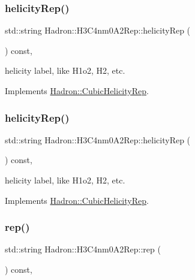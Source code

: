 \subsubsection{\texorpdfstring{helicityRep()}{helicityRep()}\hspace{0.1cm}{\footnotesize\ttfamily [2/3]}}
{\footnotesize\ttfamily std\+::string Hadron\+::\+H3\+C4nm0\+A2\+Rep\+::helicity\+Rep (\begin{DoxyParamCaption}{ }\end{DoxyParamCaption}) const\hspace{0.3cm}{\ttfamily [inline]}, {\ttfamily [virtual]}}

helicity label, like H1o2, H2, etc. 

Implements \mbox{\hyperlink{structHadron_1_1CubicHelicityRep_af1096946b7470edf0a55451cc662f231}{Hadron\+::\+Cubic\+Helicity\+Rep}}.

\mbox{\label{structHadron_1_1H3C4nm0A2Rep_a14eb635569428c91f83b7019b68ab2b6}} 
\subsubsection{\texorpdfstring{helicityRep()}{helicityRep()}\hspace{0.1cm}{\footnotesize\ttfamily [3/3]}}
{\footnotesize\ttfamily std\+::string Hadron\+::\+H3\+C4nm0\+A2\+Rep\+::helicity\+Rep (\begin{DoxyParamCaption}{ }\end{DoxyParamCaption}) const\hspace{0.3cm}{\ttfamily [inline]}, {\ttfamily [virtual]}}

helicity label, like H1o2, H2, etc. 

Implements \mbox{\hyperlink{structHadron_1_1CubicHelicityRep_af1096946b7470edf0a55451cc662f231}{Hadron\+::\+Cubic\+Helicity\+Rep}}.

\mbox{\label{structHadron_1_1H3C4nm0A2Rep_ab4e5ed700d7f03a7c2b8368304277671}} 
\subsubsection{\texorpdfstring{rep()}{rep()}\hspace{0.1cm}{\footnotesize\ttfamily [1/5]}}
{\footnotesize\ttfamily std\+::string Hadron\+::\+H3\+C4nm0\+A2\+Rep\+::rep (\begin{DoxyParamCaption}{ }\end{DoxyParamCaption}) const\hspace{0.3cm}{\ttfamily [inline]}, {\ttfamily [virtual]}}



